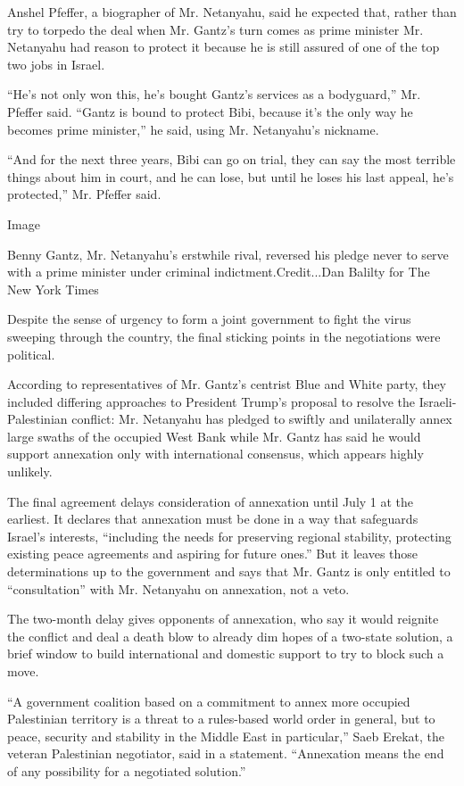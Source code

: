 Anshel Pfeffer, a biographer of Mr. Netanyahu, said he expected that,
rather than try to torpedo the deal when Mr. Gantz's turn comes as prime
minister Mr. Netanyahu had reason to protect it because he is still
assured of one of the top two jobs in Israel.

``He's not only won this, he's bought Gantz's services as a bodyguard,''
Mr. Pfeffer said. ``Gantz is bound to protect Bibi, because it's the
only way he becomes prime minister,'' he said, using Mr. Netanyahu's
nickname.

``And for the next three years, Bibi can go on trial, they can say the
most terrible things about him in court, and he can lose, but until he
loses his last appeal, he's protected,'' Mr. Pfeffer said.

Image

Benny Gantz, Mr. Netanyahu's erstwhile rival, reversed his pledge never
to serve with a prime minister under criminal indictment.Credit...Dan
Balilty for The New York Times

Despite the sense of urgency to form a joint government to fight the
virus sweeping through the country, the final sticking points in the
negotiations were political.

According to representatives of Mr. Gantz's centrist Blue and White
party, they included differing approaches to President Trump's proposal
to resolve the Israeli-Palestinian conflict: Mr. Netanyahu has pledged
to swiftly and unilaterally annex large swaths of the occupied West Bank
while Mr. Gantz has said he would support annexation only with
international consensus, which appears highly unlikely.

The final agreement delays consideration of annexation until July 1 at
the earliest. It declares that annexation must be done in a way that
safeguards Israel's interests, ``including the needs for preserving
regional stability, protecting existing peace agreements and aspiring
for future ones.'' But it leaves those determinations up to the
government and says that Mr. Gantz is only entitled to ``consultation''
with Mr. Netanyahu on annexation, not a veto.

The two-month delay gives opponents of annexation, who say it would
reignite the conflict and deal a death blow to already dim hopes of a
two-state solution, a brief window to build international and domestic
support to try to block such a move.

``A government coalition based on a commitment to annex more occupied
Palestinian territory is a threat to a rules-based world order in
general, but to peace, security and stability in the Middle East in
particular,'' Saeb Erekat, the veteran Palestinian negotiator, said in a
statement. ``Annexation means the end of any possibility for a
negotiated solution.''

